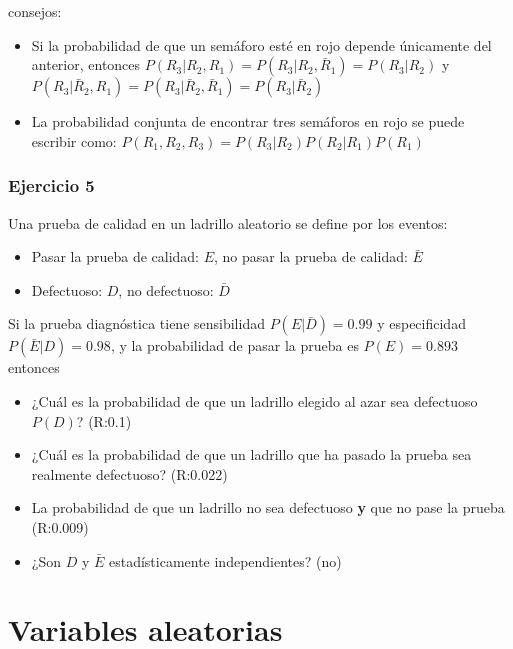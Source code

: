 \documentclass[
]{book}
\providecommand{\tightlist}{%
  \setlength{\itemsep}{0pt}\setlength{\parskip}{0pt}}
\begin{document}
consejos:

\begin{itemize}
\item
  Si la probabilidad de que un semáforo esté en rojo depende únicamente del anterior, entonces
  \(P(R_3|R_2,R_1)=P(R_3|R_2,\bar{R}_1)=P(R_3|R_2)\) y \(P(R_3|\bar{R}_2,R_1)=P(R_3 |\bar{R}_2,\bar{R}_1)=P(R_3|\bar{R}_2)\)
\item
  La probabilidad conjunta de encontrar tres semáforos en rojo se puede escribir como:
  \(P(R_1,R_2,R_3)=P(R_3|R_2)P(R_2|R_1)P(R_1)\)
\end{itemize}

\hypertarget{ejercicio-5}{%
\subsubsection{Ejercicio 5}\label{ejercicio-5}}

Una prueba de calidad en un ladrillo aleatorio se define por los eventos:

\begin{itemize}
\tightlist
\item
  Pasar la prueba de calidad: \(E\), no pasar la prueba de calidad: \(\bar{E}\)
\item
  Defectuoso: \(D\), no defectuoso: \(\bar{D}\)
\end{itemize}

Si la prueba diagnóstica tiene sensibilidad \(P(E|\bar{D})=0.99\) y especificidad \(P(\bar{E}|D)=0.98\), y la probabilidad de pasar la prueba es \(P(E) =0.893\) entonces

\begin{itemize}
\item
  ¿Cuál es la probabilidad de que un ladrillo elegido al azar sea defectuoso \(P(D)\)? (R:0.1)
\item
  ¿Cuál es la probabilidad de que un ladrillo que ha pasado la prueba sea realmente defectuoso? (R:0.022)
\item
  La probabilidad de que un ladrillo no sea defectuoso \textbf{y} que no pase la prueba (R:0.009)
\item
  ¿Son \(D\) y \(\bar{E}\) estadísticamente independientes? (no)
\end{itemize}

\hypertarget{variables-aleatorias}{%
\section{Variables aleatorias}\label{variables-aleatorias}}
\end{document}
